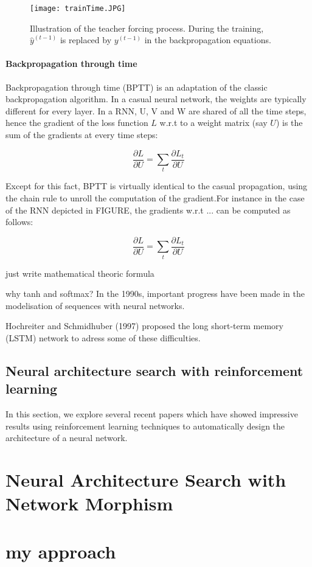 \documentclass[11pt, onecolumn, a4paper]{report}
\begin{document}
\begin{figure}[H]
\texttt{[image: trainTime.JPG]}
\caption{Illustration of the teacher forcing process. During the training, $\hat{y}^{(t-1)}$ is replaced by $y^{(t-1)}$ in the backpropagation equations.}
\end{figure}



\subsubsection{Backpropagation through time}

Backpropagation through time (BPTT) is an adaptation of the classic backpropagation algorithm. In a casual neural network, the weights are typically different for every layer. In a RNN, U, V and W are shared of all the time steps, hence the gradient of the loss function $L$ w.r.t to a weight matrix (say $U$) is the sum of the gradients at every time steps:


$$ \frac{\partial L}{\partial U}=\sum_t \frac{\partial L_t}{\partial U} $$

Except for this fact, BPTT is virtually identical to the casual propagation, using the chain rule to unroll the computation of the gradient.For instance in the case of the RNN depicted in FIGURE, the gradients w.r.t ... can be computed as follows:

$$  \frac{\partial L}{\partial U}=\sum_t \frac{\partial L_t}{\partial U} $$

just write mathematical theoric formula 

why tanh and softmax?
In the 1990s, important progress have been made in the modelisation of sequences with neural networks.

Hochreiter and Schmidhuber (1997) proposed the long short-term memory (LSTM) network to adress some of these difficulties.

\section{Neural architecture search with reinforcement learning}

In this section, we explore several recent papers which have showed impressive results using reinforcement learning techniques to automatically design the architecture of a neural network.





\chapter{Neural Architecture Search with Network Morphism}

\chapter{my approach}
\end{document}

